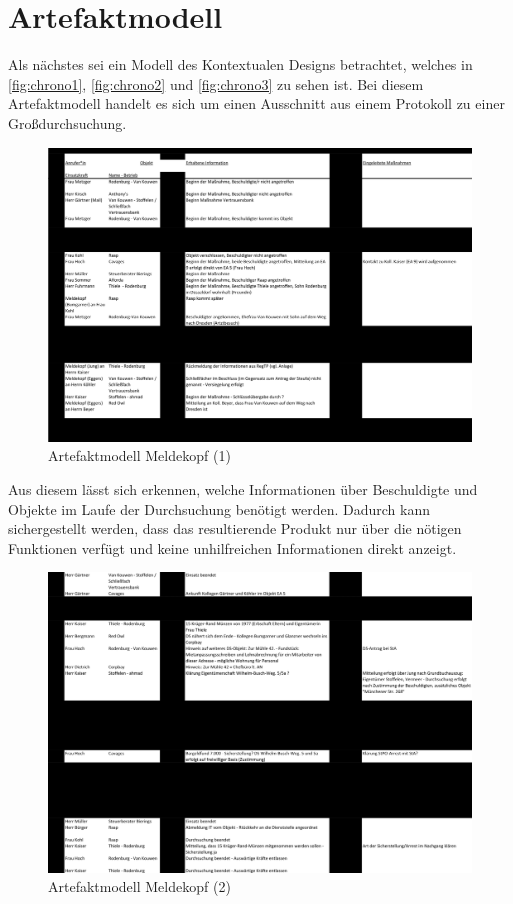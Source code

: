 \section{Artefaktmodell}

Als nächstes sei ein Modell des Kontextualen Designs betrachtet, welches in \autoref{fig:chrono1}, \autoref{fig:chrono2} und \autoref{fig:chrono3} zu sehen ist.
Bei diesem Artefaktmodell handelt es sich um einen Ausschnitt aus einem Protokoll zu einer Großdurchsuchung.

\begin{figure}[htp]
    \centering
    \includegraphics[width=.75\textwidth]{images/0-Artefaktmodell/Chronologie_Meldekopf-1.png}
    \caption{Artefaktmodell Meldekopf (1)}
    \label{fig:chrono1}
\end{figure}

Aus diesem lässt sich erkennen, welche Informationen über Beschuldigte und Objekte im Laufe der Durchsuchung benötigt werden.
Dadurch kann sichergestellt werden, dass das resultierende Produkt nur über die nötigen Funktionen verfügt und keine unhilfreichen Informationen direkt anzeigt.

\begin{figure}[htp]
    \centering
    \includegraphics[width=.75\textwidth]{images/0-Artefaktmodell/Chronologie_Meldekopf-2.png}
    \caption{Artefaktmodell Meldekopf (2)}
    \label{fig:chrono2}
\end{figure}

